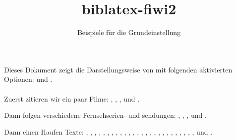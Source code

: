 \documentclass[a4paper]{scrartcl}
\begin{document}
\title{biblatex-fiwi2}\subtitle{Beispiele für die Grundeinstellung}\date{}\maketitle
\noindent Dieses Dokument zeigt die Darstellungsweise von  mit folgenden aktivierten Optionen:   und .\\ \\

\noindent Zuerst zitieren wir ein paar Filme: , , ,  und .

Dann folgen verschiedene Fernsehserien- und sendungen: , , ,  und .

Dann einen Haufen Texte: \textcite{sklovskij.v:1969a} \textcite{Spiegel.S:2010c}, \textcite{Muller.A:2010a}, \textcite{Wells.H:1908}, \textcite{Spiegel.S:2007b}, \textcite{Lukian.1981}, \textcite{Kepler.J:1993}, \textcite{Coleridge:1983a}, \textcite{vonMatt.P:2002}, \textcite{Keitz.U:2004a}, \textcite{Wells.HG:1980}, \textcite{Ackerman.Strickland:1981}, \textcite{Anderson.P:1971a}, \textcite{Gaudreault.A:1993}, \textcite{Poe.E:1982c}, \textcite{Poe.E:1999a}, \textcite{Parrinder.P:1980}, \textcite{Wells.H:1980*2}, \textcite{James.H:2004a}, \textcite{James.H:2007a}, \textcite{Hedeler.W:2005a}, \textcite{Ballhausen.T:2009a}, \textcite{Zymner.R:2003a}, \textcite{Zymner.R:2011a}, \textcite{Nelmes.J:2011b}, \textcite{Kuhn.A:1990*2,Blish.J:1973a,Dureau.Y:2005a}, \textcite{Todorov.T:1992}, \textcite{Bordwell.D:2004a} und \textcite{Kirchner.A:2008a}.


\printbibliography[nottype=movie]
\newrefcontext[sorting=title]
\printbibliography[type=movie,heading=film]
\end{document}
